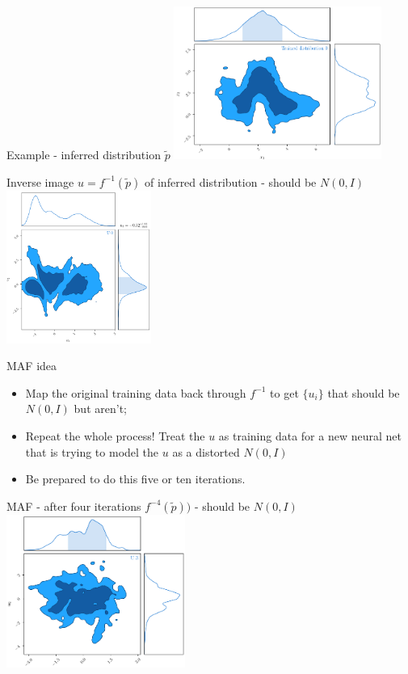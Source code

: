 \documentclass[usenames,dvipsnames]{beamer}
\begin{document}
\begin{frame}{Example - inferred distribution $\tilde{p}$}
     \centering
     \includegraphics[height=5cm]{image_08}
\end{frame}

\begin{frame}{Inverse image $u = f^{-1}(\tilde{p})$ of inferred distribution - should be $N(0, I)$}
     \centering
     \includegraphics[height=5cm]{image_09}
\end{frame}

\begin{frame}{MAF idea}
    \begin{itemize}
      \item{Map the original training data back through $f^{-1}$ to get $\{u_i\}$ that should be $N(0, I)$ but aren't;}
      \item{Repeat the whole process! Treat the $u$ as training data for a new neural net that is trying to model the $u$ as a distorted $N(0, I)$}
      \item{Be prepared to do this five or ten iterations.}
    \end{itemize}
\end{frame}

\begin{frame}{MAF - after four iterations $f^{-4}(\tilde{p}))$ - should be $N(0, I)$}
     \centering
     \includegraphics[height=5cm]{image_10}
\end{frame}
\end{document}
